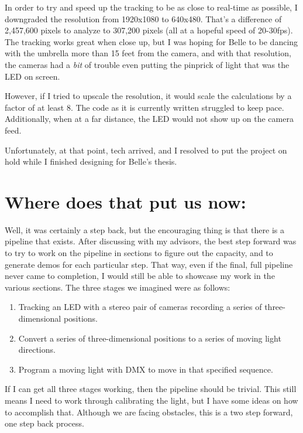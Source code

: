 \documentclass[
    12pt,
    twoside,
    bibstyle=chicago,
    headerstyle=uppercase,
	bibfile=biblatex_updating.bib
]{reedthesis}
\begin{document}
In order to try and speed up the tracking to be as close to real-time as possible, I downgraded the resolution from 1920x1080 to 640x480. That's a difference of 2,457,600 pixels to analyze to 307,200 pixels (all at a hopeful speed of 20-30fps). The tracking works great when close up, but I was hoping for Belle to be dancing with the umbrella more than 15 feet from the camera, and with that resolution, the cameras had a \textit{bit} of trouble even putting the pinprick of light that was the LED on screen. 

However, if I tried to upscale the resolution, it would scale the calculations by a factor of at least 8. The code as it is currently written struggled to keep pace. Additionally, when at a far distance, the LED would not show up on the camera feed.

Unfortunately, at that point, tech arrived, and I resolved to put the project on hold while I finished designing for Belle's thesis.

\section{Where does that put us now:}

Well, it was certainly a step back, but the encouraging thing is that there is a pipeline that exists. After discussing with my advisors, the best step forward was to try to work on the pipeline in sections to figure out the capacity, and to generate demos for each particular step. That way, even if the final, full pipeline never came to completion, I would still be able to showcase my work in the various sections. The three stages we imagined were as follows:
\begin{enumerate}
	\item Tracking an LED with a stereo pair of cameras recording a series of three-dimensional positions.
	\item Convert a series of three-dimensional positions to a series of moving light directions.
	\item Program a moving light with DMX to move in that specified sequence.
\end{enumerate}

If I can get all three stages working, then the pipeline should be trivial. This still means I need to work through calibrating the light, but I have some ideas on how to accomplish that. Although we are facing obstacles, this is a two step forward, one step back process.


\end{document}
